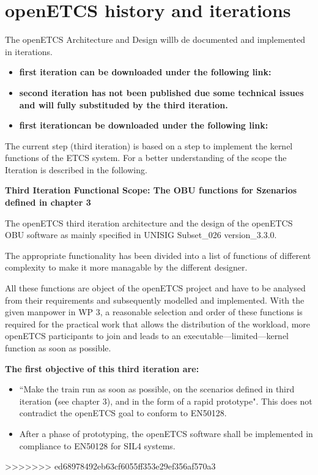 \section{openETCS history and iterations}
The openETCS Architecture and Design willb de documented and implemented in iterations. 

\begin{itemize}
\item \textbf{first iteration can be downloaded under the following link:}
\end{itemize}


\begin{itemize}
\item \textbf{second iteration has not been published due some technical issues and will fully substituded by the third iteration.}
\end{itemize}

\begin{itemize}
\item \textbf{first iterationcan be downloaded under the following link:}
\end{itemize}
The current step (third iteration) is based on a step to implement the kernel functions of the ETCS system. For a better understanding of the scope the Iteration is described in the following.

\textbf{Third Iteration Functional Scope: The OBU functions for Szenarios defined in chapter 3}

The openETCS third iteration architecture and the design of the openETCS OBU software as mainly specified in \cite{subset-026} UNISIG Subset\_026 version\_3.3.0. 

The appropriate functionality has been divided into a list of functions of different complexity to make it more managable by the different designer.

All these functions are object of the openETCS project and have to be analysed from their requirements and subsequently modelled and implemented. With the given manpower in WP 3, a reasonable selection and order of these functions is required for the practical work that allows the distribution of the workload, more openETCS participants to join and leads to an executable---limited---kernel function as soon as possible. 


\textbf{The first objective of this third iteration are:}
\begin{itemize}
\item ``Make the train run as soon as possible, on the scenarios defined in third iteration \textbf(see chapter 3), and in the form of a rapid prototype".
This does not contradict the openETCS goal to conform to EN50128.
\item After a phase of prototyping, the openETCS software shall be implemented in compliance to EN50128 for SIL4 systems.
\end{itemize}


>>>>>>> ed68978492eb63cf6055ff353e29ef356af570a3
